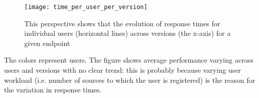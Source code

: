 \begin{figure}[h!]
  \centering
  \texttt{[image: time\_per\_user\_per\_version]}
  \caption{This perspective shows that the evolution of response times for individual users (horizontal lines) across versions (the x-axis) for a given endpoint}
  \label{fig:tuv}
\end{figure}


The colors represent users. The figure shows average performance varying  across users and versions with no clear trend: this is probably because varying user workload (i.e. number of sources to which the user is registered) is the reason for the variation in response times. 


  
